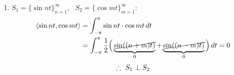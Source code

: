 \begin{enumerate}[label=\arabic*)]
Consider $\{e^{jnt}\}_{n=-\infty}^{\infty}$, \quad $e^{jnt}\in\V$ for all $n$.
\[
\inner{f_1(t)}{f_2(t)} = \int_{-\pi}^{\pi} f_1(t)\,\overline{f_2(t)}\,dt
\]
\begin{align*}
\inner{e^{jnt}}{e^{jmt}} &= \int_{-\pi}^{\pi} e^{jnt}\,e^{-jmt}\,dt = \int_{-\pi}^{\pi} e^{j(n-m)t}\,dt\\
&= \int_{-\pi}^{\pi}\big[\cos((n-m)t) + j\sin((n-m)t)\big]\,dt\\
&= \int_{-\pi}^{\pi}\cos((n-m)t)\,dt + j\underbrace{\cancel{\int_{-\pi}^{\pi}\sin((n-m)t)\,dt}}_{0}
\end{align*}
\begin{center}
\begin{minipage}{0.5\textwidth}
\small $\left.\begin{array}{l}\sin t\\ \sin 2t\\ \sin 3t\\ \ \vdots\end{array}\right\}$ all zero due to integral over a period
\end{minipage}%
\begin{minipage}{0.35\textwidth}
\centering
{}
\end{minipage}
\end{center}
\begin{align*}
\inner{e^{jnt}}{e^{jmt}} &= \begin{cases} 2\pi, & n = m\\ 0, & n\neq m\end{cases}\\
&= 2\pi\,\delta_{nm}
\end{align*}
\item $S_1 = \{\sin nt\}_{n=1}^\infty$, \ $S_2 = \{\cos mt\}_{m=1}^\infty$:
\begin{align*}
\left\langle \sin nt, \cos mt \right\rangle &= \int_{-\pi}^{\pi}\sin nt\cdot\cos mt\,dt\\
&= \int_{-\pi}^{\pi}\frac12\Big(\underbrace{\cancel{\sin((n+m)t)}}_{0} + \underbrace{\cancel{\sin((n-m)t)}}_{0}\Big)\,dt = 0
\end{align*}
\[
\therefore\ \key{$S_1\perp S_2$}
\]
\end{enumerate}

